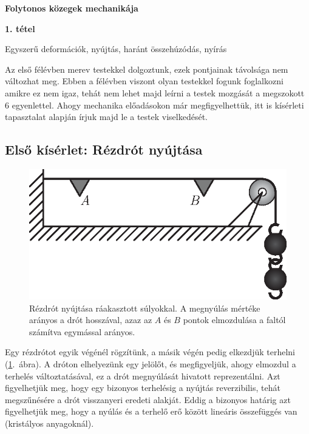 \documentclass[a4paper, 12pt]{article}
\begin{document}
\begin{titlepage}\centering
\vspace*{250 pt}
\Huge \textbf{Folytonos közegek mechanikája}

\LARGE \textbf{1. tétel}

\LARGE Egyszerű deformációk, nyújtás, haránt összehúzódás, nyírás

\vspace*{\fill}
\end{titlepage}

\newpage
Az első félévben merev testekkel dolgoztunk, ezek pontjainak távolsága nem változhat meg. Ebben a félévben viszont olyan testekkel fogunk foglalkozni amikre ez nem igaz, tehát nem lehet majd leírni a testek mozgását a megszokott 6 egyenlettel. Ahogy mechanika előadásokon már megfigyelhettük, itt is kísérleti tapasztalat alapján írjuk majd le a testek viselkedését.

\subsection*{Első kísérlet: Rézdrót nyújtása}
\begin{figure}[htb]
\centering
\includegraphics[scale=1]{tetel_01_abra_01.eps}
\caption{Rézdrót nyújtása ráakasztott súlyokkal. \label{fig:rezdrot_nyujtasa} A megnyúlás mértéke arányos a drót hosszával, azaz az $A$ és $B$ pontok elmozdulása a faltól számítva egymással arányos.}
\end{figure}

Egy rézdrótot egyik végénél rögzítünk, a másik végén pedig elkezdjük terhelni (\ref{fig:rezdrot_nyujtasa}.\ ábra). A dróton elhelyezünk egy jelölőt, és megfigyeljük, ahogy elmozdul a terhelés változtatásával, ez a drót megnyúlását hivatott reprezentálni. Azt figyelhetjük meg, hogy egy bizonyos terhelésig a nyújtás reverzibilis, tehát megszűnésére a drót visszanyeri eredeti alakját. Eddig a bizonyos határig azt figyelhetjük meg, hogy a nyúlás és a terhelő erő között lineáris összefüggés van (kristályos anyagoknál).
        
\end{document}
